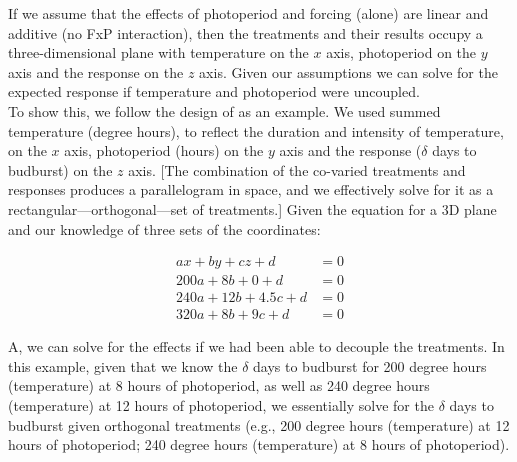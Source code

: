 \documentclass[11pt]{article}
\begin{document}
If we assume that the effects of photoperiod and forcing (alone) are linear and additive (no FxP interaction), then the treatments and their results occupy a three-dimensional plane with temperature on the $x$ axis, photoperiod on the $y$ axis and the response on the $z$ axis. Given our assumptions we can solve for the expected response if temperature and photoperiod were uncoupled. \\

To show this, we follow the design of \cite{Flynn2018} as an example. We used summed temperature (degree hours), to reflect the duration and intensity of temperature, on the $x$ axis, photoperiod (hours) on the $y$ axis and the response ($\delta$ days to budburst) on the $z$ axis. [The combination of the co-varied treatments and responses produces a parallelogram in space, and we effectively solve for it as a rectangular---orthogonal---set of treatments.] Given the equation for a 3D plane and our knowledge of three sets of the coordinates:

\begin{align}
ax+by+cz+d & =0\\
200a + 8b + 0 + d &= 0\\
240a + 12b+4.5c + d &=0\\
320a + 8b + 9c+ d &=0
\end{align}

A, we can solve for the effects if we had been able to decouple the treatments. In this example, given that we know the $\delta$ days to budburst for 200 degree hours (temperature) at 8 hours of photoperiod, as well as 240 degree hours (temperature) at 12 hours of photoperiod, we essentially solve for the $\delta$ days to budburst given orthogonal treatments (e.g., 200 degree hours (temperature) at 12 hours of photoperiod; 240 degree hours (temperature) at 8 hours of photoperiod). \\
\end{document}
